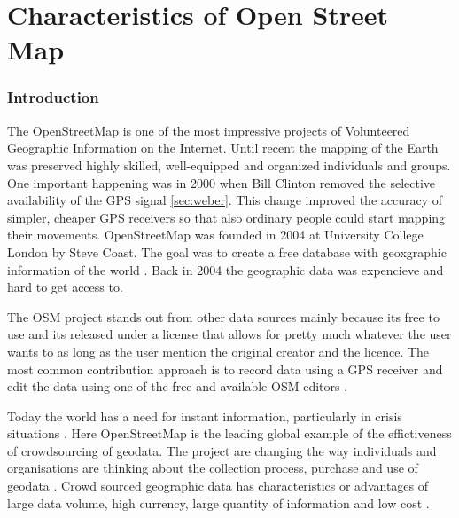 \chapter{Characteristics of Open Street Map}
	
\subsection{Introduction}
The OpenStreetMap is one of the most impressive projects of Volunteered Geographic Information on the Internet\cite{Neis2012}. Until recent the mapping of the Earth was preserved highly skilled, well-equipped and organized individuals and groups. One important happening was in 2000 when Bill Clinton removed the selective availability of the GPS signal \ref{sec:weber}. This change improved the accuracy of simpler, cheaper GPS receivers so that also ordinary people could start mapping their movements. OpenStreetMap was founded in 2004 at University College London by Steve Coast. The goal was to create a free database with geoxgraphic information of the world \cite{Neis2012}. Back in 2004 the geographic data was expencieve and hard to get access to. 

The OSM project stands out from other data sources mainly because its free to use and its released under a license that allows for pretty much whatever the user wants to as long as the user mention the original creator and the licence\cite{Chilton}.  The most common contribution approach is to record data using a GPS receiver and edit the data using one of the free and available OSM editors \cite{Neis2012}.  

Today the world has a need for instant information, particularly in crisis situations \cite{Chilton}. Here OpenStreetMap is the leading global example of the effictiveness of crowdsourcing of geodata. The project are changing the way individuals and organisations are thinking about the collection process, purchase and use of geodata \cite{Chilton}.  Crowd sourced geographic data has characteristics or advantages of large data volume, high currency, large quantity of information and low cost \cite{Wang2013}.  

